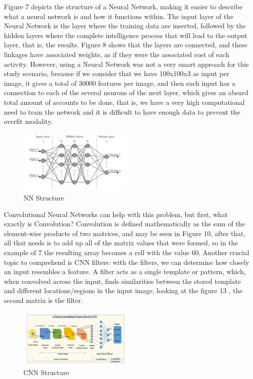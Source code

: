 \documentclass[conference]{IEEEtran}
\begin{document}
Figure 7 depicts the structure of a Neural Network, making it easier to describe what a neural network is and how it functions within. The input layer of the Neural Network is the layer where the training data are inserted, followed by the hidden layers where the complete intelligence process that will lead to the output layer, that is, the results. Figure 8 shows that the layers are connected, and these linkages have associated weights, as if they were the associated cost of each activity. However, using a Neural Network was not a very smart approach for this study scenario, because if we consider that we have 100x100x3 as input per image, it gives a total of 30000 features per image, and then each input has a connection to each of the several neurons of the next layer, which gives an absurd total amount of accounts to be done, that is, we have a very high computational need to train the network and it is difficult to have enough data to prevent the overfit modality. 

\begin{figure}[H]
\centering
    \includegraphics[width=0.5\textwidth]{images/NNStructure.png}
    \caption{NN Structure}
\end{figure}

Convolutional Neural Networks can help with this problem, but first, what exactly is Convolution? Convolution is defined mathematically as the sum of the element-wise products of two matrices, and may be seen in Figure 10, after that, all that needs is to add up all of the matrix values that were formed, so in the example of 7 the resulting array becomes a cell with the value 60. Another crucial topic to comprehend is CNN filters: with the filters, we can determine how closely an input resembles a feature. A filter acts as a single template or pattern, which, when convolved across the input, finds similarities between the stored template and different locations/regions in the input image, looking at the figure 13 , the second matrix is the filter.

\begin{figure}[H]
\centering
    \includegraphics[width=0.5\textwidth]{images/CNNStructure.png}
    \caption{CNN Structure}
\end{figure}
\end{document}
